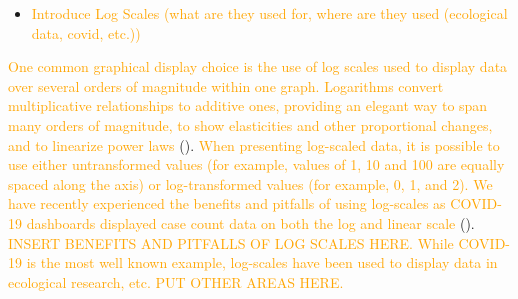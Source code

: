 \documentclass[]{interact}
\theoremstyle{plain}%
\theoremstyle{definition}
\theoremstyle{remark}
\begin{document}
\begin{itemize}
\item
  \textcolor{Orange}{Introduce Log Scales (what are they used for, where are they used (ecological data, covid, etc.))}
\end{itemize}

\textcolor{Orange}{One common graphical display choice is the use of log scales used to display data over several orders of magnitude within one graph. Logarithms convert multiplicative relationships to additive ones, providing an elegant way to span many orders of magnitude, to show elasticities and other proportional changes, and to linearize power laws}
(\citet{menge_logarithmic_2018}).
\textcolor{Orange}{When presenting log-scaled data, it is possible to use either untransformed values (for example, values of 1, 10 and 100 are equally spaced along the axis) or log-transformed values (for example, 0, 1, and 2). We have recently experienced the benefits and pitfalls of using log-scales as COVID-19 dashboards displayed case count data on both the log and linear scale}
(\citet{wade_fagen_ulmschneider_2020}).
\textcolor{Orange}{INSERT BENEFITS AND PITFALLS OF LOG SCALES HERE. While COVID-19 is the most well known example, log-scales have been used to display data in ecological research, etc. PUT OTHER AREAS HERE.}
\end{document}
